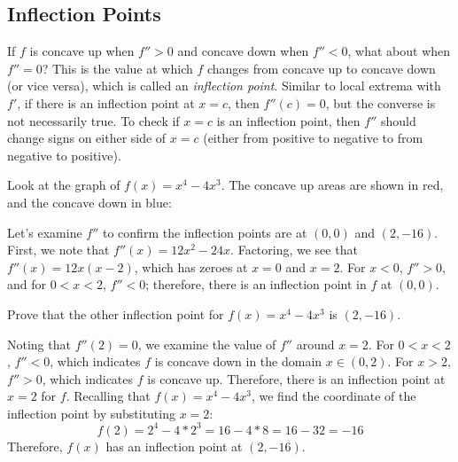 \subsection{Inflection Points}
If $f$ is concave up when $f''>0$ and concave down when $f''<0$, what about when $f''=0$? This is the value at which $f$ changes from concave up to concave down (or vice versa), which is called an \textit{inflection point}. Similar to local extrema with $f'$, if there is an inflection point at $x=c$, then $f''(c)=0$, but the converse is not necessarily true. To check if $x=c$ is an inflection point, then $f''$ should change signs on either side of $x=c$ (either from positive to negative to from negative to positive). 

Look at the graph of $f(x) = x^4-4x^3$. The concave up areas are shown in red, and the concave down in blue:

\begin{figure}[htbp]
\centering
{}
\end{figure}
Let's examine $f''$ to confirm the inflection points are at $(0, 0)$ and $(2, -16)$. First, we note that $f''(x) = 12x^2-24x$. Factoring, we see that $f''(x) = 12x(x-2)$, which has zeroes at $x=0$ and $x=2$. For $x<0$, $f''>0$, and for $0<x<2$, $f''<0$; therefore, there is an inflection point in $f$ at $(0, 0)$. 

\begin{Exercise}[label=concavity1]
Prove that the other inflection point for $f(x) = x^4-4x^3$ is $(2, -16)$.
\end{Exercise}

\begin{Answer}[ref=concavity1]
Noting that $f''(2)=0$, we examine the value of $f''$ around $x=2$. For $0<x<2$, $f''<0$, which indicates $f$ is concave down in the domain $x \in (0,2)$. For $x>2$, $f''>0$, which indicates $f$ is concave up. Therefore, there is an inflection point at $x=2$ for $f$. Recalling that $f(x) = x^4-4x^3$, we find the coordinate of the inflection point by substituting $x=2$:
$$f(2) = 2^4-4*2^3=16-4*8=16-32=-16$$
Therefore, $f(x)$ has an inflection point at $(2, -16)$.
\end{Answer}

